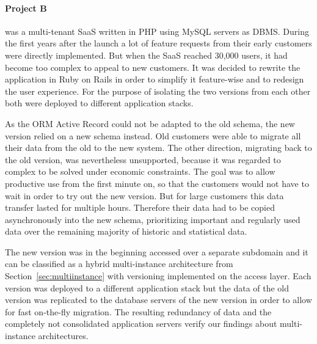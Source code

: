 \paragraph{Project B} was a multi-tenant SaaS written in PHP using MySQL servers as DBMS.
During the first years after the launch a lot of feature requests from their early customers were directly implemented.
But when the SaaS reached 30,000 users, it had become too complex to appeal to new customers.
It was decided to rewrite the application in Ruby on Rails in order to simplify it feature-wise and to redesign the user experience.
For the purpose of isolating the two versions from each other both were deployed to different application stacks.

As the ORM Active Record could not be adapted to the old schema, the new version relied on a new schema instead.
Old customers were able to migrate all their data from the old to the new system.
The other direction, migrating back to the old version, was nevertheless unsupported, because it was regarded to complex to be solved under economic constraints.
The goal was to allow productive use from the first minute on, so that the customers would not have to wait in order to try out the new version.
But for large customers this data transfer lasted for multiple hours.
Therefore their data had to be copied asynchronously into the new schema, prioritizing important and regularly used data over the remaining majority of historic and statistical data.

The new version was in the beginning accessed over a separate subdomain and it can be classified as a hybrid multi-instance architecture from Section~\ref{sec:multiinstance} with versioning implemented on the access layer.
Each version was deployed to a different application stack but the data of the old version was replicated to the database servers of the new version in order to allow for fast on-the-fly migration.
The resulting redundancy of data and the completely not consolidated application servers verify our findings about multi-instance architectures.







